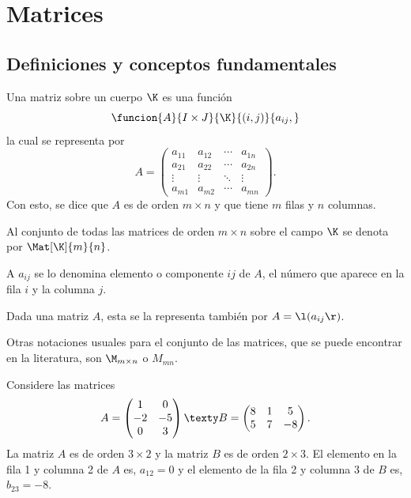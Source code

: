 \documentclass[compacto,10pt]{pubciencias-notas}
\begin{document}

\encabezado


\vspace{-8mm}

\section{Matrices}
\subsection{Definiciones y conceptos fundamentales}

\begin{defi}[Matriz]
    Una matriz sobre un cuerpo $\K$ es una función 
    \[
        \funcion{A}{I\times J}{\K}
        {(i,j)}{a_{ij},}
    \]
    la cual se representa por
    \[
        A = 
        \begin{pmatrix}
        a_{11} & a_{12} & \cdots & a_{1n} \\ 
        a_{21} & a_{22} & \cdots & a_{2n} \\ 
        \vdots & \vdots & \ddots & \vdots\\ 
        a_{m1} & a_{m2} & \cdots & a_{mn}
        \end{pmatrix}.
    \]
    Con esto, se dice que $A$ es de orden $m \times n$ y que tiene $m$ filas y $n$ columnas. 
    
    Al conjunto de todas las matrices de orden $m \times n$ sobre el campo $\K$ se denota por $\Mat[\K]{m}{n}$.
\end{defi}

\begin{obs} 
A $a_{ij}$ se lo denomina elemento o componente $ij$ de $A$, el número que aparece en la fila $i$ y la columna $j$.
\end{obs}

\begin{advertencia}
    Dada una matriz $A$, esta se la representa también por $A=\l(a_{ij}\r)$.
\end{advertencia}

\begin{advertencia}
    Otras notaciones usuales para el conjunto de las matrices, que se puede encontrar en la literatura, son $\M_{m\times n}$ o $M_{mn}$.
\end{advertencia}

\begin{ejem}\hspace{0pt} Considere las matrices
\[
    A = \begin{pmatrix}1&0\\-2&-5\\0&3\end{pmatrix}
    \texty
    B = \begin{pmatrix}8&1&5\\5&7&-8\end{pmatrix}.
\]
La matriz $A$ es de orden $3 \times 2$ y la matriz $B$ es de orden $2 \times 3$. El elemento en la fila 1 y columna 2 de $A$ es, $a_{12} = 0$ y el elemento de la fila 2 y columna 3 de $B$ es, $b_{23} = -8$.
\end{ejem}
\end{document}
